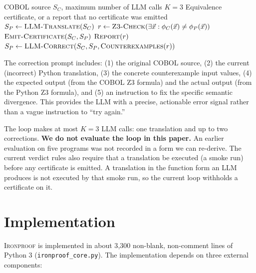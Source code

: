 \documentclass[sigconf,nonacm]{acmart}
\begin{document}
\begin{algorithm}[t]
\caption{LLM-Z3 Feedback Loop}\label{alg:feedback}
\begin{algorithmic}[1]
\Require COBOL source $S_C$, maximum number of LLM calls $K=3$
\Ensure Equivalence certificate, or a report that no certificate was emitted
\State $S_P \gets \textsc{LLM-Translate}(S_C)$ 
  \State $r \gets \textsc{Z3-Check}(\exists \vec{x}: \phi_C(\vec{x}) \neq \phi_P(\vec{x}))$
    \State \Return $\textsc{Emit-Certificate}(S_C, S_P)$
    \State \Return $\textsc{Report}(r)$
  \EndIf
  \State $S_P \gets \textsc{LLM-Correct}(S_C, S_P, \textsc{Counterexamples}(r))$ 
\EndFor
\end{algorithmic}
\end{algorithm}

The correction prompt includes: (1) the original COBOL source, (2) the current (incorrect) Python translation, (3) the concrete counterexample input values, (4) the expected output (from the COBOL Z3 formula) and the actual output (from the Python Z3 formula), and (5) an instruction to fix the specific semantic divergence. This provides the LLM with a precise, actionable error signal rather than a vague instruction to ``try again.''

The loop makes at most $K=3$ LLM calls: one translation and up to two corrections. \textbf{We do not evaluate the loop in this paper.} An earlier evaluation on five programs was not recorded in a form we can re-derive. The current verdict rules also require that a translation be executed (a smoke run) before any certificate is emitted. A translation in the function form an LLM produces is not executed by that smoke run, so the current loop withholds a certificate on it.


\section{Implementation}\label{sec:implementation}

\textsc{Ironproof} is implemented in about 3{,}300 non-blank, non-comment lines of Python 3 (\texttt{ironproof\_core.py}). The implementation depends on three external components:
\end{document}
